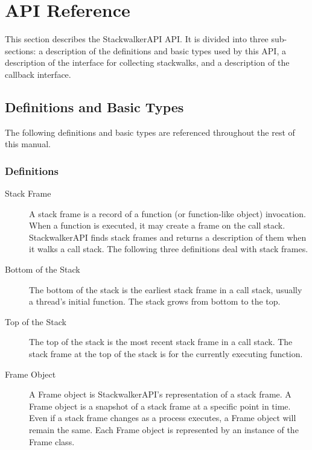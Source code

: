\section{API Reference}
\label{sec:api}

This section describes the StackwalkerAPI API. It is divided into three
sub-sections: a description of the definitions and basic types used by this API,
a description of the interface for collecting stackwalks, and a description of
the callback interface.

\subsection{Definitions and Basic Types}
The following definitions and basic types are referenced throughout the rest of
this manual.

\subsubsection{Definitions}
\label{subsec:definitions}
\begin{description}

\item [Stack Frame] A stack frame is a record of a function (or function-like
    object) invocation. When a function is executed, it may create a frame on
    the call stack. StackwalkerAPI finds stack frames and returns a description
    of them when it walks a call stack.  The following three definitions deal
    with stack frames.

\item [Bottom of the Stack] The bottom of the stack is the earliest stack frame
    in a call stack, usually a thread's initial function. The stack grows from
    bottom to the top.

\item [Top of the Stack] The top of the stack is the most recent stack frame in
    a call stack. The stack frame at the top of the stack is for the currently
    executing function.

\item [Frame Object] A Frame object is StackwalkerAPI's representation of a
    stack frame. A Frame object is a snapshot of a stack frame at a specific
    point in time. Even if a stack frame changes as a process executes, a Frame
    object will remain the same. Each Frame object is represented by an instance
    of the Frame class.

\end{description}

